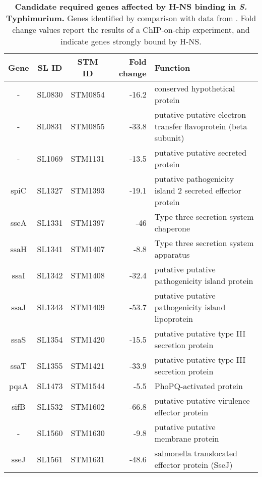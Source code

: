 %
\begin{table}
   \tiny
   \centering
   \noindent
    \caption[Candidate required genes affected by H-NS binding in {\it S.} Typhimurium]{\textbf{Candidate required genes affected by H-NS binding in {\it S.} Typhimurium.} Genes identified by comparison with data from \textcite{Navarre2006}. Fold change values report the results of a ChIP-on-chip experiment, and indicate genes strongly bound by H-NS. }
    \begin{tabular}{ c
    				c
				c
				r
				l
				}
   
    \\
     \toprule
    \textbf{Gene} & \textbf{SL ID} & \textbf{STM ID} & \textbf{Fold change} & \textbf{Function} \\
    \midrule
    -     & SL0830 & STM0854 & -16.2 & conserved hypothetical protein \\
    -     & SL0831 & STM0855 & -33.8 & putative putative electron transfer flavoprotein (beta subunit) \\
    -     & SL1069 & STM1131 & -13.5 & putative putative secreted protein \\
    spiC  & SL1327 & STM1393 & -19.1 & putative pathogenicity island 2 secreted effector protein \\
    sseA  & SL1331 & STM1397 & -46   & Type three secretion system chaperone \\
    ssaH  & SL1341 & STM1407 & -8.8  & Type three secretion system apparatus \\
    ssaI  & SL1342 & STM1408 & -32.4 & putative putative pathogenicity island protein \\
    ssaJ  & SL1343 & STM1409 & -53.7 & putative putative pathogenicity island lipoprotein \\
            ssaS & SL1354 & STM1420 & -15.5 & putative putative type III secretion protein \\
    ssaT  & SL1355 & STM1421 & -33.9 & putative putative type III secretion protein \\
    pqaA  & SL1473 & STM1544 & -5.5  & PhoPQ-activated protein \\
    sifB  & SL1532 & STM1602 & -66.8 & putative putative virulence effector protein \\
    -     & SL1560 & STM1630 & -9.8  & putative putative membrane protein \\
    sseJ  & SL1561 & STM1631 & -48.6 & salmonella translocated effector protein (SseJ) \\

\end{tabular}
\end{table}
